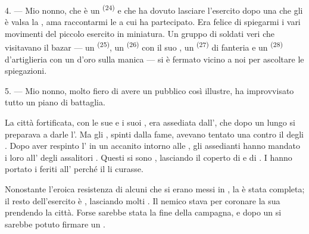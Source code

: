 \VUsaut{4.0mm}
\VUsaut{2.8mm}

4. --- Mio nonno, che è un  \textsuperscript{(24)} e che ha
dovuto lasciare l'esercito dopo una  che gli è valsa la
, ama raccontarmi le  a cui ha
partecipato. Era felice di spiegarmi i vari movimenti del piccolo esercito in
miniatura. Un gruppo di soldati veri che visitavano il bazar --- un 
\textsuperscript{(25)}, un  \textsuperscript{(26)} con il suo
, un  \textsuperscript{(27)} di fanteria e
un  \textsuperscript{(28)} d'artiglieria con un  d'oro
sulla manica --- si è fermato vicino a noi per ascoltare le spiegazioni.

5. --- Mio nonno, molto fiero di avere un pubblico così illustre, ha improvvisato tutto
un piano di battaglia.

La città fortificata, con le sue  e i suoi , era assediata
dall', che dopo un lungo  si preparava a
darle l'. Ma gli , spinti dalla fame, avevano tentato
una  contro il  degli . Dopo aver
respinto l' in un  accanito intorno alle
, gli assedianti  hanno mandato i loro
 all' degli assalitori .
Questi si sono , lasciando il  coperto di
 e di . I  hanno portato i feriti
all' perché il  li curasse.

Nonostante l'eroica resistenza di alcuni  che si erano messi in
, la  è stata completa; il resto dell'esercito è
, lasciando molti . Il nemico stava per coronare la
sua  prendendo la città. Forse sarebbe stata la fine della campagna, e
dopo un  si sarebbe potuto firmare un .

\VUsaut{4.4mm}
\VUsaut{2.8mm}

